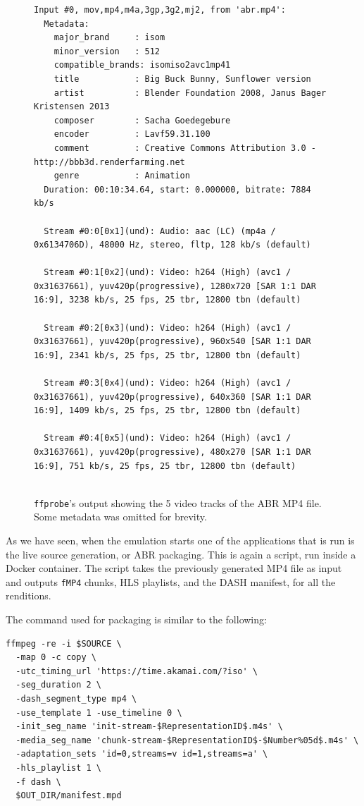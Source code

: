 \begin{figure}
    \centering
    \begin{verbatim}
Input #0, mov,mp4,m4a,3gp,3g2,mj2, from 'abr.mp4':
  Metadata:
    major_brand     : isom
    minor_version   : 512
    compatible_brands: isomiso2avc1mp41
    title           : Big Buck Bunny, Sunflower version
    artist          : Blender Foundation 2008, Janus Bager Kristensen 2013
    composer        : Sacha Goedegebure
    encoder         : Lavf59.31.100
    comment         : Creative Commons Attribution 3.0 - http://bbb3d.renderfarming.net
    genre           : Animation
  Duration: 00:10:34.64, start: 0.000000, bitrate: 7884 kb/s
  
  Stream #0:0[0x1](und): Audio: aac (LC) (mp4a / 0x6134706D), 48000 Hz, stereo, fltp, 128 kb/s (default)
  
  Stream #0:1[0x2](und): Video: h264 (High) (avc1 / 0x31637661), yuv420p(progressive), 1280x720 [SAR 1:1 DAR 16:9], 3238 kb/s, 25 fps, 25 tbr, 12800 tbn (default)
  
  Stream #0:2[0x3](und): Video: h264 (High) (avc1 / 0x31637661), yuv420p(progressive), 960x540 [SAR 1:1 DAR 16:9], 2341 kb/s, 25 fps, 25 tbr, 12800 tbn (default)
  
  Stream #0:3[0x4](und): Video: h264 (High) (avc1 / 0x31637661), yuv420p(progressive), 640x360 [SAR 1:1 DAR 16:9], 1409 kb/s, 25 fps, 25 tbr, 12800 tbn (default)
  
  Stream #0:4[0x5](und): Video: h264 (High) (avc1 / 0x31637661), yuv420p(progressive), 480x270 [SAR 1:1 DAR 16:9], 751 kb/s, 25 fps, 25 tbr, 12800 tbn (default)
  
    \end{verbatim}
    \caption{\texttt{ffprobe}'s output showing the 5 video tracks of the ABR MP4 file. Some metadata was omitted for brevity.}
    \label{fig:ffprobe_abr}
\end{figure}

As we have seen, when the emulation starts one of the applications that is run is the live source generation, or ABR packaging. This is again a \ffmpeg{} script, run inside a Docker container. The script takes the previously generated MP4 file as input and outputs \texttt{fMP4} chunks, HLS playlists, and the DASH manifest, for all the renditions.

The \ffmpeg{} command used for packaging is similar to the following:

\begin{verbatim}
ffmpeg -re -i $SOURCE \
  -map 0 -c copy \
  -utc_timing_url 'https://time.akamai.com/?iso' \
  -seg_duration 2 \
  -dash_segment_type mp4 \
  -use_template 1 -use_timeline 0 \
  -init_seg_name 'init-stream-$RepresentationID$.m4s' \
  -media_seg_name 'chunk-stream-$RepresentationID$-$Number%05d$.m4s' \
  -adaptation_sets 'id=0,streams=v id=1,streams=a' \
  -hls_playlist 1 \
  -f dash \
  $OUT_DIR/manifest.mpd
\end{verbatim}

